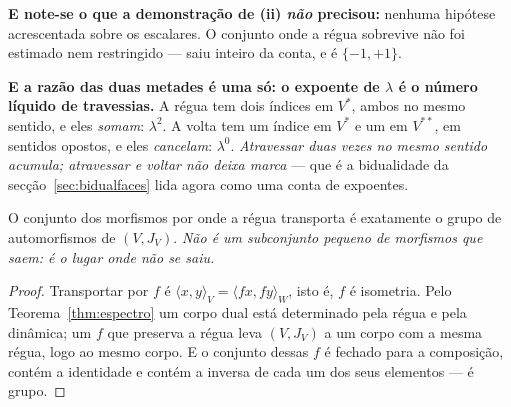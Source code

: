 \documentclass[livro.tex]{subfiles}
\begin{document}
\noindent \textbf{E note-se o que a demonstração de (ii) \emph{não} precisou:} nenhuma hipótese
acrescentada sobre os escalares. O conjunto onde a régua sobrevive não foi estimado nem restringido
--- saiu inteiro da conta, e é $\{-1,+1\}$.

\noindent \textbf{E a razão das duas metades é uma só: o expoente de $\lambda$ é o número líquido de
travessias.} A régua tem dois índices em $V^{*}$, ambos no mesmo sentido, e eles \emph{somam}: $\lambda^{2}$.
A volta tem um índice em $V^{*}$ e um em $V^{**}$, em sentidos opostos, e eles \emph{cancelam}:
$\lambda^{0}$. \emph{Atravessar duas vezes no mesmo sentido acumula; atravessar e voltar não deixa
marca} --- que é a bidualidade da secção~\ref{sec:bidualfaces} lida agora como uma conta de expoentes.

\begin{corolario}\label{cor:transporte}
O conjunto dos morfismos por onde a régua transporta é exatamente o grupo de automorfismos de
$(V,J_{V})$. \emph{Não é um subconjunto pequeno de morfismos que saem: é o lugar onde não se saiu.}
\end{corolario}

\begin{proof}
Transportar por $f$ é $\langle x,y\rangle_{V}=\langle fx,fy\rangle_{W}$, isto é, $f$ é isometria. Pelo
Teorema~\ref{thm:espectro} um corpo dual está determinado pela régua e pela dinâmica; um $f$ que
preserva a régua leva $(V,J_{V})$ a um corpo com a mesma régua, logo ao mesmo corpo. E o conjunto
dessas $f$ é fechado para a composição, contém a identidade e contém a inversa de cada um dos seus
elementos --- é grupo.
\end{proof}

\end{document}
